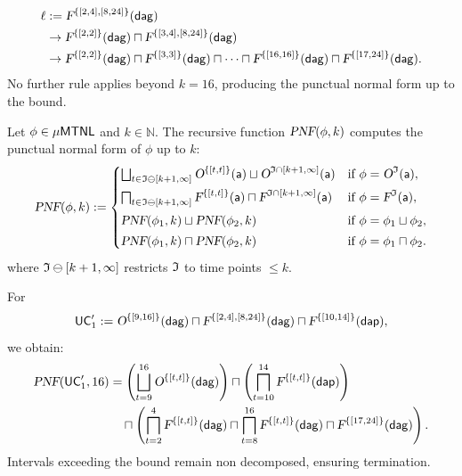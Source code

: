 \begin{example}[Applying \textbf{RightPunctF$^k$} to $\forb{\{[2,4],[8,24]\}}{\delAtGate}$ with $k=16$]
\begin{align*}
\ell &:= \textsl{F}^{\{[2,4],[8,24]\}}(\mathsf{\mathsf{dag}}) \\
&\to \textsl{F}^{\{[2,2]\}}(\mathsf{\mathsf{dag}}) \sqcap \textsl{F}^{\{[3,4],[8,24]\}}(\mathsf{\mathsf{dag}}) \\
&\to \textsl{F}^{\{[2,2]\}}(\mathsf{\mathsf{dag}}) \sqcap \textsl{F}^{\{[3,3]\}}(\mathsf{\mathsf{dag}})
    \sqcap \cdots
    \sqcap \textsl{F}^{\{[16,16]\}}(\mathsf{\mathsf{dag}})
    \sqcap \textsl{F}^{\{[17,24]\}}(\mathsf{\mathsf{dag}}).
\end{align*}
No further rule applies beyond \(k=16\), producing the punctual normal form up to the bound.
\end{example}

\begin{definition}\label{def:pnf}
Let $\phi\in\mathsf{\mu MTNL}$ and \(k\in\mathbb{N}\).  
The recursive function $\textsl{PNF}(\phi,k)$ computes the punctual normal form of $\phi$ up to $k$:
\[
\textsl{PNF}(\phi,k) :=
\begin{cases}
\bigsqcup_{t\in\mathfrak{I}\ominus[k+1,\infty]}\textsl{O}^{\{[t,t]\}}(\mathsf{a}) \sqcup \textsl{O}^{\mathfrak{I}\cap[k+1,\infty]}(\mathsf{a})
& \text{if } \phi=\textsl{O}^{\mathfrak{I}}(\mathsf{a}), \\[1ex]
\bigsqcap_{t\in\mathfrak{I}\ominus[k+1,\infty]}\textsl{F}^{\{[t,t]\}}(\mathsf{a}) \sqcap \textsl{F}^{\mathfrak{I}\cap[k+1,\infty]}(\mathsf{a})
& \text{if } \phi=\textsl{F}^{\mathfrak{I}}(\mathsf{a}), \\[1ex]
\textsl{PNF}(\phi_1,k)\sqcup\textsl{PNF}(\phi_2,k)
& \text{if } \phi=\phi_1\sqcup\phi_2, \\[0.5ex]
\textsl{PNF}(\phi_1,k)\sqcap\textsl{PNF}(\phi_2,k)
& \text{if } \phi=\phi_1\sqcap\phi_2.
\end{cases}
\]
where $\mathfrak{I}\ominus[k+1,\infty]$ restricts $\mathfrak{I}$ to time points $\le k$.
\end{definition}

\begin{example}[$\pnf(\UC_1',16)$]
For
\[
\mathsf{UC}_1' := 
\textsl{O}^{\{[9,16]\}}(\mathsf{\mathsf{dag}}) 
\sqcap 
\textsl{F}^{\{[2,4],[8,24]\}}(\mathsf{\mathsf{dag}}) 
\sqcap 
\textsl{F}^{\{[10,14]\}}(\mathsf{\mathsf{dap}}),
\]
we obtain:
\begin{align*}
\textsl{PNF}(\mathsf{UC}_1',16)
&= \left(\bigsqcup_{t=9}^{16}\textsl{O}^{\{[t,t]\}}(\mathsf{\mathsf{dag}})\right)
   \sqcap
   \left(\bigsqcap_{t=10}^{14}\textsl{F}^{\{[t,t]\}}(\mathsf{\mathsf{dap}})\right)\\
&\quad\sqcap
   \left(\bigsqcap_{t=2}^{4}\textsl{F}^{\{[t,t]\}}(\mathsf{\mathsf{dag}})
   \sqcap
   \bigsqcap_{t=8}^{16}\textsl{F}^{\{[t,t]\}}(\mathsf{\mathsf{dag}})
   \sqcap
   \textsl{F}^{\{[17,24]\}}(\mathsf{\mathsf{dag}})\right).
\end{align*}
Intervals exceeding the bound remain non decomposed, ensuring termination.
\end{example}



